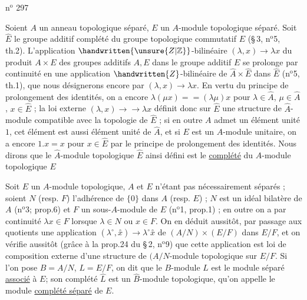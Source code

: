 

\hfill n$^{\mathrm{o}}$ 297

Soient $A$ un anneau topologique séparé, $E$ un $A$-module topologique séparé. Soit $\hat E$ le groupe additif complété du groupe topologique commutatif $E$ (\S\,3, n$^{\mathrm{o}}$5, th.2). L'application $\handwritten{\unsure{Z|\mathbb Z}}$-bilinéaire $(\lambda,x)\longrightarrow\lambda x$ du produit $A\times E$ des groupes additifs $A,E$ dans le groupe additif $E$ se prolonge par continuité en une application $\handwritten{Z}$-bilinéaire de $\hat A\times\hat E$ dans $\hat E$ (n$^{\mathrm{o}}$5, th.1), que nous désignerons encore par $(\lambda,x)\longrightarrow\lambda x$. En vertu du principe de prolongement des identités, on a encore $\lambda(\mu x)={}=(\lambda\mu)x$ pour $\lambda\in\hat A$, $\mu\in\hat A$, $x\in\hat E$ ; la loi externe $(\lambda,x)\longrightarrow{}\longrightarrow\lambda x$ définit donc sur $\hat E$ une structure de $\hat A$-module compatible avec la topologie de $\hat E$ ; si en outre $A$ admet un élément unité $1$, cet élément est aussi élément unité de $\hat A$, et si $E$ est un $A$-module unitaire, on a encore $1.x=x$ pour $x\in\hat E$ par le principe de prolongement des identités. Nous dirons que le $\hat A$-module topologique $\hat E$ ainsi défini est le \uline{complété} du $A$-module topologique $E$

Soit $E$ un $A$-module topologique, $A$ et $E$ n'étant pas nécessairement séparés ; soient $N$ (resp. $F$) l'adhérence de $\{0\}$ dans $A$ (resp. $E$) ; $N$ est un idéal bilatère de $A$ (n$^{\mathrm{o}}$3; prop.6) et $F$ un sous-$A$-module de $E$ (n$^{\mathrm{o}}$1, prop.1) ; en outre on a par continuité $\lambda x\in F$ lorsque $\lambda\in N$ ou $x\in F$. On en déduit aussitôt, par passage aux quotients une application $(\lambda^{\circ},\overset{\circ}{x})\longrightarrow\lambda^{\circ}\overset{\circ}{x}$ de $(A/N)\times(E/F)$ dans $E/F$, et on vérifie aussitôt (grâce à la prop.24 du \S\,2, n$^{\mathrm{o}}$9) que cette application est loi de composition externe d'une structure de $(A/N$-module topologique sur $E/F$. Si l'on pose $B=A/N$, $L=E/F$, on dit que le $B$-module $L$ est le module séparé \uline{associé} à $E$; son complété $\hat L$ est un $\hat B$-module topologique, qu'on appelle le module \uline{complété séparé} de $E$.



